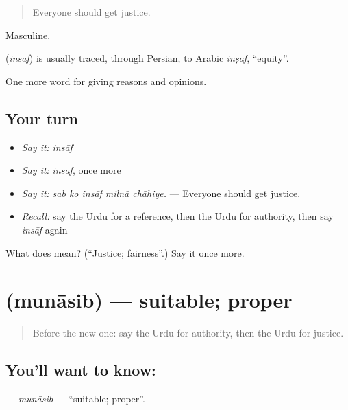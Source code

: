\begin{quote}
Everyone should get justice.
\end{quote}

Masculine.

\begin{cousinweb}
\textbf{} (\emph{insāf}) is usually traced, through Persian, to Arabic \emph{inṣāf}, \textquotedblleft{}equity\textquotedblright{}.
\end{cousinweb}

\begin{grammarlens}[title={What you've built}]
One more word for giving reasons and opinions.
\end{grammarlens}

\subsection*{Your turn}
\begin{itemize}
\raggedright
  \item \emph{Say it:} \emph{insāf}
  \item \emph{Say it:} \emph{insāf}, once more
  \item \emph{Say it:} \emph{sab ko insāf milnā chāhiye.} — Everyone should get justice.
  \item \emph{Recall:} say the Urdu for a reference, then the Urdu for authority, then say \emph{insāf} again
\end{itemize}

\begin{tcolorbox}[breakable,colback=teal!4,colframe=teal!35!black,title={Before you move on}]
What does  mean? (\textquotedblleft{}Justice; fairness\textquotedblright{}.) Say it once more.
\end{tcolorbox}
\section[\texorpdfstring{\ur{مناسب} (munāsib)}{مناسب (munāsib)}]{ (munāsib) — suitable; proper}

\label{lesson:UR-C339-munasib}



\begin{quote}
Before the new one: say the Urdu for authority, then the Urdu for justice.
\end{quote}

\subsection*{You'll want to know: }
\textbf{} — \emph{munāsib} — \textquotedblleft{}suitable; proper\textquotedblright{}.

